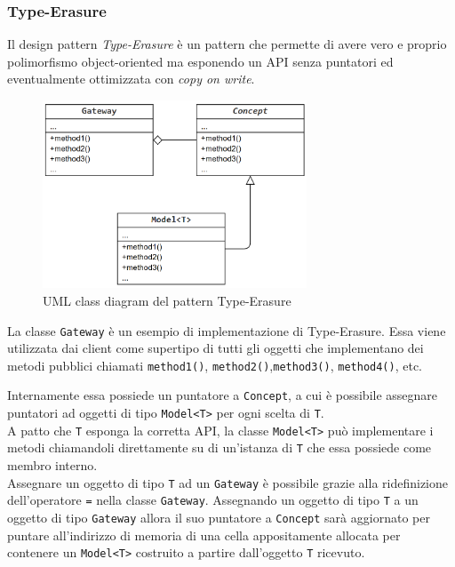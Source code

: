 
\subsubsection{Type-Erasure}
Il design pattern \textit{Type-Erasure} è un pattern che permette di avere vero e proprio polimorfismo 
object-oriented ma esponendo un API senza puntatori ed eventualmente ottimizzata con \textit{copy on write}.

\begin{figure}[H]
    \centering
        \includegraphics[width=0.7\textwidth]{../../Assets/TypeErasure.png}
    \caption{UML class diagram del pattern Type-Erasure}
\end{figure}

La classe \texttt{Gateway} è un esempio di implementazione di Type-Erasure. Essa viene utilizzata dai client 
come supertipo di tutti gli oggetti che implementano dei metodi pubblici chiamati \texttt{method1()}, 
\texttt{method2()},\texttt{method3()}, \texttt{method4()}, etc. \\

\newpage

Internamente essa possiede un puntatore a \texttt{Concept}, a cui è possibile assegnare 
puntatori ad oggetti di tipo \texttt{Model<T>} per ogni scelta di \texttt{T}. \\

A patto che \texttt{T} esponga la corretta API, la classe \texttt{Model<T>} può implementare i metodi chiamandoli 
direttamente su di un'istanza di \texttt{T} che essa possiede come membro interno. \\

Assegnare un oggetto di tipo \texttt{T} ad un \texttt{Gateway} è possibile grazie alla ridefinizione dell'operatore \texttt{=}
nella classe \texttt{Gateway}. Assegnando un oggetto di tipo \texttt{T} a un oggetto di tipo \texttt{Gateway} allora 
il suo puntatore a \texttt{Concept} sarà aggiornato per puntare all'indirizzo di memoria di una cella appositamente allocata 
per contenere un \texttt{Model<T>} costruito a partire dall'oggetto \texttt{T} ricevuto. \\

